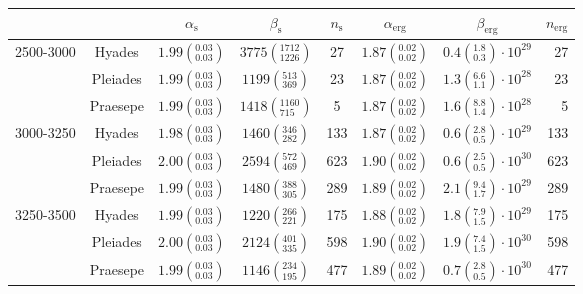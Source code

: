 \begin{tabular}{lccccccr}
\hline
          &         &                $\alpha_\mathrm{s}$ &                 $\beta_\mathrm{s}$ & $n_\mathrm{s}$ &              $\alpha_\mathrm{erg}$ &                          $\beta_\mathrm{erg}$ & $n_\mathrm{erg}$ \\
\hline
2500-3000 & Hyades &  $1.99\left(^{0.03}_{0.03}\right)$ &  $3775\left(^{1712}_{1226}\right)$ &             27 &  $1.87\left(^{0.02}_{0.02}\right)$ &   $0.4\left(^{1.8}_{0.3}\right)\cdot 10^{29}$ &               27 \\
          & Pleiades &  $1.99\left(^{0.03}_{0.03}\right)$ &    $1199\left(^{513}_{369}\right)$ &             23 &  $1.87\left(^{0.02}_{0.02}\right)$ &   $1.3\left(^{6.6}_{1.1}\right)\cdot 10^{28}$ &               23 \\
          & Praesepe &  $1.99\left(^{0.03}_{0.03}\right)$ &   $1418\left(^{1160}_{715}\right)$ &              5 &  $1.87\left(^{0.02}_{0.02}\right)$ &   $1.6\left(^{8.8}_{1.4}\right)\cdot 10^{28}$ &                5 \\
3000-3250 & Hyades &  $1.98\left(^{0.03}_{0.03}\right)$ &    $1460\left(^{346}_{282}\right)$ &            133 &  $1.87\left(^{0.02}_{0.02}\right)$ &   $0.6\left(^{2.8}_{0.5}\right)\cdot 10^{29}$ &              133 \\
          & Pleiades &  $2.00\left(^{0.03}_{0.03}\right)$ &    $2594\left(^{572}_{469}\right)$ &            623 &  $1.90\left(^{0.02}_{0.02}\right)$ &   $0.6\left(^{2.5}_{0.5}\right)\cdot 10^{30}$ &              623 \\
          & Praesepe &  $1.99\left(^{0.03}_{0.03}\right)$ &    $1480\left(^{388}_{305}\right)$ &            289 &  $1.89\left(^{0.02}_{0.02}\right)$ &   $2.1\left(^{9.4}_{1.7}\right)\cdot 10^{29}$ &              289 \\
3250-3500 & Hyades &  $1.99\left(^{0.03}_{0.03}\right)$ &    $1220\left(^{266}_{221}\right)$ &            175 &  $1.88\left(^{0.02}_{0.02}\right)$ &   $1.8\left(^{7.9}_{1.5}\right)\cdot 10^{29}$ &              175 \\
          & Pleiades &  $2.00\left(^{0.03}_{0.03}\right)$ &    $2124\left(^{401}_{335}\right)$ &            598 &  $1.90\left(^{0.02}_{0.02}\right)$ &   $1.9\left(^{7.4}_{1.5}\right)\cdot 10^{30}$ &              598 \\
          & Praesepe &  $1.99\left(^{0.03}_{0.03}\right)$ &    $1146\left(^{234}_{195}\right)$ &            477 &  $1.89\left(^{0.02}_{0.02}\right)$ &   $0.7\left(^{2.8}_{0.5}\right)\cdot 10^{30}$ &              477 \\

\end{tabular}
